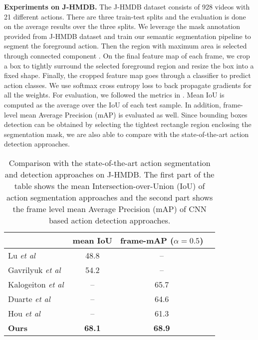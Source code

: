 \documentclass{bmvc2k}
\def\etal{\emph{et al}\bmvaOneDot}
\begin{document}
\textbf{Experiments on J-HMDB.}
The J-HMDB dataset consists of 928 videos with 21 different actions. There are three train-test splits and the evaluation is done on the average results over the three splits. We leverage the mask annotation provided from J-HMDB dataset and train our semantic segmentation pipeline to segment the foreground action. Then the region with maximum area is selected through connected component \cite{he2009fast}. On the final feature map of each frame, we crop a box to tightly surround the selected foreground region and resize the box into a fixed shape. Finally, the cropped feature map goes through a classifier to predict action classes. We use softmax cross entropy loss to back propagate gradients for all the weights. For evaluation, we followed the metrics in \cite{gavrilyuk2018actor}. Mean IoU is computed as the average over the IoU of each test sample. In addition, frame-level mean Average Precision (mAP) is evaluated as well. Since bounding boxes detection can be obtained by selecting the tightest rectangle region enclosing the segmentation mask, we are also able to compare with the state-of-the-art action detection approaches. 
\begin{table}[!htbp]
\centering
\small
\begin{tabular}{lccc}
\hline
                                                & mean IoU      & frame-mAP ($\alpha=0.5$)\\
\hline
Lu \etal~\cite{lu2015human}                     & 48.8          & -- \\
Gavrilyuk \etal~\cite{gavrilyuk2018actor}       & 54.2          & -- \\
\hline
Kalogeiton \etal \cite{kalogeiton2017action}    & --            & 65.7 \\
Duarte \etal \cite{duarte2018videocapsulenet}   & --            & 64.6 \\
Hou \etal \cite{hou2017tube}                    & --            & 61.3 \\
\hline
\textbf{Ours}                                   & \textbf{68.1} & \textbf{68.9} \\
\hline
\end{tabular}
\caption{Comparison with the state-of-the-art action segmentation and detection approaches on J-HMDB. The first part of the table shows the mean Intersection-over-Union (IoU) of action segmentation approaches and the second part shows the frame level mean Average Precision (mAP) of CNN based action detection approaches.}
\label{tab:jhmdb-segmentation}
\end{table}
\end{document}
